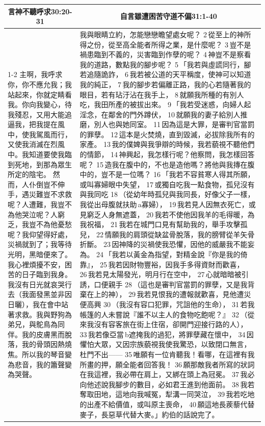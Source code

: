 \begin{itemize}
\begin{table}[H]
\centering 
\begin{tabular}{p{}|p{38.6em}}    \toprule 
\multicolumn{1}{c|}{言神不聽呼求30:20-31}& \multicolumn{1}{c}{自言雖遭困苦守道不偏31:1-40}\\\cline{1-2}
主啊，我呼求你，你不應允我；我站起來，你就定睛看我。你向我變心，待我殘忍，又用大能追逼我，把我提在風中，使我駕風而行，又使我消滅在烈風中。我知道要使我臨到死地，到那為眾生所定的陰宅。
然而，人仆倒豈不伸手，遇災難豈不求救呢？人遭難，我豈不為他哭泣呢？人窮乏，我豈不為他憂愁呢？我仰望得好處，災禍就到了；我等待光明，黑暗便來了。我心裡煩擾不安，困苦的日子臨到我身。我沒有日光就哀哭行去（我面發黑並非因日曬），我在會中站著求救。我與野狗為弟兄，與鴕鳥為同伴。我的皮膚黑而脫落，我的骨頭因熱燒焦。所以我的琴音變為悲音，我的簫聲變為哭聲。
&我與眼睛立約，怎能戀戀瞻望處女呢？ 2 從至上的神所得之份，從至高全能者所得之業，是什麼呢？ 3 豈不是禍患臨到不義的，災害臨到作孽的呢？ 4 神豈不是察看我的道路，數點我的腳步呢？
5 「我若與虛謊同行，腳若追隨詭詐， 6 我若被公道的天平稱度，使神可以知道我的純正， 7 我的腳步若偏離正路，我的心若隨著我的眼目，若有玷汙沾在我手上， 8 就願我所種的有別人吃，我田所產的被拔出來。
9 「我若受迷惑，向婦人起淫念，在鄰舍的門外蹲伏， 10 就願我的妻子給別人推磨，別人也與她同室。 11 因為這是大罪，是審判官當罰的罪孽。 12 這本是火焚燒，直到毀滅，必拔除我所有的家產。 13 我的僕婢與我爭辯的時候，我若藐視不聽他們的情節， 14 神興起，我怎樣行呢？他察問，我怎樣回答呢？ 15 造我在腹中的，不也是造他嗎？將他與我摶在腹中的，豈不是一位嗎？
16 「我若不容貧寒人得其所願，或叫寡婦眼中失望， 17 或獨自吃我一點食物，孤兒沒有與我同吃 18 （從幼年時孤兒與我同長，好像父子一樣，我從出母腹就扶助 a寡婦）， 19 我若見人因無衣死亡，或見窮乏人身無遮蓋， 20 我若不使他因我羊的毛得暖，為我祝福， 21 我若在城門口見有幫助我的，舉手攻擊孤兒， 22 情願我的肩頭從缺盆骨脫落，我的膀臂從羊矢骨折斷。 23 因神降的災禍使我恐懼，因他的威嚴我不能妄為。
24 「我若以黃金為指望，對精金說『你是我的倚靠』， 25 我若因財物豐裕，因我手多得資財而歡喜， 26 我若見太陽發光，明月行在空中， 27 心就暗暗被引誘，口便親手 28 （這也是審判官當罰的罪孽，又是我背棄在上的神）， 29 我若見恨我的遭報就歡喜，見他遭災便高興 30 （我沒有容口犯罪，咒詛他的生命）， 31 若我帳篷的人未嘗說『誰不以主人的食物吃飽呢？』 32 （從來我沒有容客旅在街上住宿，卻開門迎接行路的人）， 33 我若像亞當 b遮掩我的過犯，將罪孽藏在懷中， 34 因懼怕大眾，又因宗族藐視我使我驚恐，以致閉口無言，杜門不出—— 35 唯願有一位肯聽我！看哪，在這裡有我所畫的押，願全能者回答我！ 36 願那敵我者所寫的狀詞在我這裡，我必帶在肩上，又綁在頭上為冠冕。 37 我必向他述說我腳步的數目，必如君王進到他面前。 38 我若奪取田地，這地向我喊冤，犁溝一同哭泣， 39 我若吃地的出產不給價值，或叫原主喪命， 40 願這地長蒺藜代替麥子，長惡草代替大麥。」約伯的話說完了。 
\\ \bottomrule
\end{tabular} 
\end{table}
\end{itemize}

